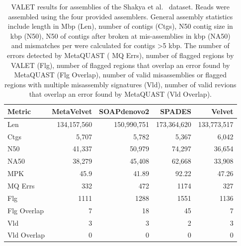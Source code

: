 \documentclass{article}
\begin{document}
\begin{table}

\caption{VALET results for assemblies of the Shakya et al.~\citep{shakya2013comparative} dataset. Reads were assembled using the four provided assemblers. General assembly statistics include length in Mbp (Len), number of contigs (Ctgs), N50 contig size in kbp (N50), N50 of contigs after broken at mis-assemblies in kbp (NA50) and mismatches per  were calculated for contigs \textgreater 5 kbp. The number of errors detected by MetaQUAST ( MQ Errs), number of flagged regions by VALET (Flg), number of flagged regions that overlap an error found by MetaQUAST (Flg Overlap), number of valid misassemblies or flagged regions with multiple misassembly signatures (Vld), number of valid revions that overlap an error found by MetaQUAST (Vld Overlap).\label{syn_comp_tbl}}
\begin{tabular}{lrrrr}
\toprule
Metric & MetaVelvet & SOAPdenovo2 & SPADES & Velvet\\
\midrule
Len & 134,157,560 & 150,990,751 & 173,364,620 & 133,773,517\\
Ctgs & 5,707 & 5,782 & 5,367 & 6,042\\
N50 & 41,337 & 50,979 & 74,297 & 36,654\\
NA50 & 38,279 & 45,408 & 62,668 & 33,908\\
MPK & 45.9 & 41.89 & 92.22 & 47.26\\
\addlinespace
MQ Errs & 332 & 472 & 1174 & 327\\
Flg & 1111 & 1288 & 1551 & 1136\\
Flg Overlap & 7 & 18 & 45 & 7\\
Vld & 3 & 3 & 2 & 3\\
Vld Overlap & 0 & 0 & 0 & 0\\
\bottomrule
\end{tabular}
\end{table}



\end{document}
